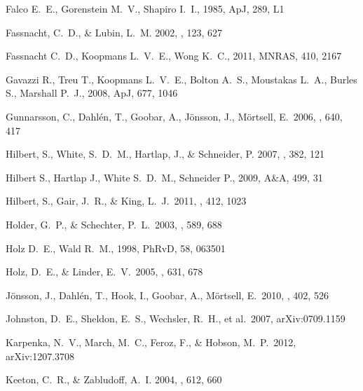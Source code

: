 \begin{thebibliography}{99}
 Falco E.~E., Gorenstein M.~V., Shapiro I.~I., 1985, ApJ, 289, L1 


{Fassnacht}, C.~D., \& {Lubin}, L.~M. 2002, \aj, 123, 627

 Fassnacht C.~D., Koopmans L.~V.~E., Wong K.~C., 2011, MNRAS, 410, 2167 


 Gavazzi R., Treu T., Koopmans L.~V.~E., 
Bolton A.~S., Moustakas L.~A., Burles S., Marshall P.~J., 2008, ApJ, 677, 
1046 

 Gunnarsson, C., 
Dahl{\'e}n, T., Goobar, A., J{\"o}nsson, J., M{\"o}rtsell, E.\ 2006, \apj, 640, 417 

{Hilbert}, S., {White}, S.~D.~M., {Hartlap}, J., \& {Schneider}, P. 2007,
  \mnras, 382, 121

 Hilbert S., Hartlap J., White S.~D.~M., Schneider P., 2009, A\&A, 499, 31 

 Hilbert, S., Gair, 
J.~R., \& King, L.~J.\ 2011, \mnras, 412, 1023 

 Holder, G.~P., \& Schechter, P.~L.\ 2003, \apj, 589, 688 


 Holz D.~E., Wald R.~M., 1998, PhRvD, 58, 063501 

 Holz, D.~E., \& Linder, E.~V.\ 2005, \apj, 631, 678 

 J{\"o}nsson, J., 
Dahl{\'e}n, T., Hook, I., Goobar, A., M{\"o}rtsell, E.\ 2010, \mnras, 402, 526 

 Johnston, D.~E., 
Sheldon, E.~S., Wechsler, R.~H., et al.\ 2007, arXiv:0709.1159 

 Karpenka, N.~V., 
March, M.~C., Feroz, F., \& Hobson, M.~P.\ 2012, arXiv:1207.3708 

{Keeton}, C.~R., \& {Zabludoff}, A.~I. 2004, \apj, 612, 660


\end{thebibliography}
